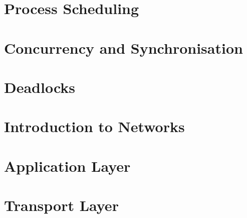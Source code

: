 \documentclass[
  11pt,
  a4paper,
]{article}
\begin{document}
\section{Process Scheduling}



\section{Concurrency and Synchronisation}



\section{Deadlocks}


\section{Introduction to Networks}



\section{Application Layer}


\section{Transport Layer}

\end{document}
